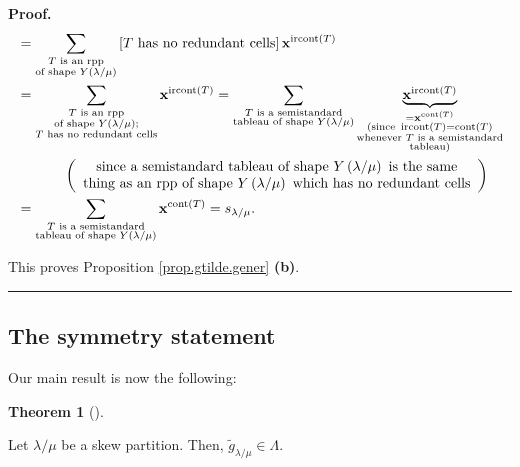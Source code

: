 \documentclass[numbers=enddot,12pt,final,onecolumn,notitlepage]{scrartcl}%
\theoremstyle{definition}
\newtheorem{theo}{Theorem}[section]
\newenvironment{theorem}[1][]
{\begin{theo}[#1]\begin{leftbar}}
{\end{leftbar}\end{theo}}
\newenvironment{proof}[1][Proof]{\noindent\textbf{#1.} }{\ \rule{0.5em}{0.5em}}
\newenvironment{verlong}{}{}
\let\sumnonlimits\sum
\renewcommand{\sum}{\sumnonlimits\limits}
\begin{document}
\begin{proof}
\begin{verlong}
\begin{align*}
&  =\sum_{\substack{T\text{ is an rpp}\\\text{of shape }Y\left(  \lambda
/\mu\right)  }}\left[  T\text{ has no redundant cells}\right]  \mathbf{x}%
^{\operatorname*{ircont}\left(  T\right)  }\\
&  =\sum_{\substack{T\text{ is an rpp}\\\text{of shape }Y\left(  \lambda
/\mu\right)  ;\\T\text{ has no redundant cells}}}\mathbf{x}%
^{\operatorname*{ircont}\left(  T\right)  }=\sum_{\substack{T\text{ is a
semistandard}\\\text{tableau of shape }Y\left(  \lambda/\mu\right)
}}\underbrace{\mathbf{x}^{\operatorname*{ircont}\left(  T\right)  }%
}_{\substack{=\mathbf{x}^{\operatorname*{cont}\left(  T\right)  }%
\\\text{(since }\operatorname*{ircont}\left(  T\right)  =\operatorname*{cont}%
\left(  T\right)  \\\text{whenever }T\text{ is a semistandard}%
\\\text{tableau)}}}\\
&  \ \ \ \ \ \ \ \ \ \ \left(
\begin{array}
[c]{c}%
\text{since a semistandard tableau of shape }Y\left(  \lambda/\mu\right)
\text{ is the same}\\
\text{thing as an rpp of shape }Y\left(  \lambda/\mu\right)  \text{ which has
no redundant cells}%
\end{array}
\right) \\
&  =\sum_{\substack{T\text{ is a semistandard}\\\text{tableau of shape
}Y\left(  \lambda/\mu\right)  }}\mathbf{x}^{\operatorname*{cont}\left(
T\right)  }=s_{\lambda/\mu}.
\end{align*}


This proves Proposition \ref{prop.gtilde.gener} \textbf{(b)}.
\end{verlong}
\end{proof}

\subsection{The symmetry statement}

Our main result is now the following:

\begin{theorem}
\label{thm.gtilde.symm}Let $\lambda/\mu$ be a skew partition. Then,
$\widetilde{g}_{\lambda/\mu}\in\Lambda$.
\end{theorem}
\end{document}
